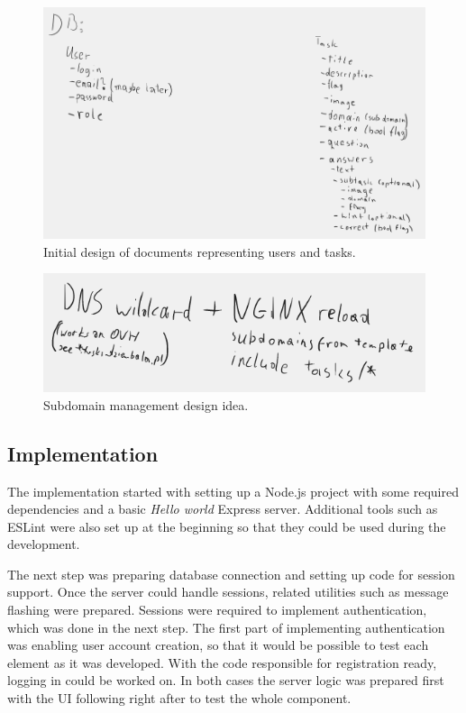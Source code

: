 \begin{figure}
	\centering
	\includegraphics[width=\textwidth]{img/init-db-struct.png}
	\caption{Initial design of documents representing users and tasks.}
	\label{fig:init-db-struct}
\end{figure}

\begin{figure}
	\centering
	\includegraphics[width=\textwidth]{img/subdomain-idea.png}
	\caption{Subdomain management design idea.}
	\label{fig:subdomain-idea}
\end{figure}

\subsection{Implementation}

The implementation started with setting up a Node.js project with some required dependencies and a basic \textit{Hello world} Express server. Additional tools such as ESLint were also set up at the beginning so that they could be used during the development.

The next step was preparing database connection and setting up code for session support. Once the server could handle sessions, related utilities such as message flashing were prepared. Sessions were required to implement authentication, which was done in the next step. The first part of implementing authentication was enabling user account creation, so that it would be possible to test each element as it was developed. With the code responsible for registration ready, logging in could be worked on. In both cases the server logic was prepared first with the UI following right after to test the whole component.

